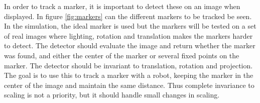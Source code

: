 In order to track a marker, it is important to detect these on an image when displayed.
In figure \ref{fig:markers} can the different markers to be tracked be seen.
In the simulation, the ideal marker is used but the markers will be tested on a set of real images where lighting, rotation and translation makes the markers harder to detect.
The detector should evaluate the image and return whether the marker was found, and either the center of the marker or several fixed points on the marker.
The detector should be invariant to translation, rotation and projection.
The goal is to use this to track a marker with a robot, keeping the marker in the center of the image and maintain the same distance.
Thus complete invariance to scaling is not a priority, but it should handle small changes in scaling.

